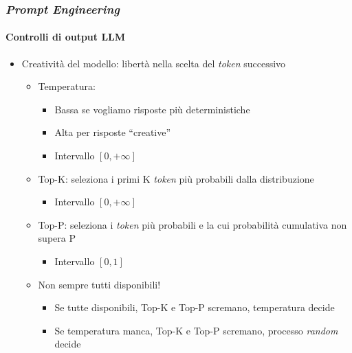 \begin{frame}[t] \frametitle{\emph{Prompt Engineering}}
\framesubtitle{Controlli di output LLM}
{\footnotesize
    \begin{minipage}[t]{\textwidth}
        \begin{itemize}[leftmargin=10pt,align=right]
            \item[\alertedcircled{2}] \alert{Creatività del modello:} libertà nella scelta del \emph{token} successivo
            \begin{itemize}[leftmargin=10pt,align=right]
                \item[\alert{\faArrowCircleRight}] \alert{Temperatura:}
                \begin{itemize}[leftmargin=10pt,align=right]
                    \item[\alert{\faArrowCircleRight}] \alert{Bassa} se vogliamo risposte più deterministiche
                    \item[\alert{\faArrowCircleRight}] \alert{Alta} per risposte ``creative''
                    \item[\alert{\faExclamationTriangle}] Intervallo $[0, +\infty]$
                \end{itemize}
                \item[\alert{\faArrowCircleRight}] \alert{Top-K:} seleziona i primi K \textit{token} più probabili dalla distribuzione
                 \begin{itemize}[leftmargin=10pt,align=right]
                    \item[\alert{\faExclamationTriangle}] Intervallo $[0, +\infty]$
                \end{itemize}               
                \item[\alert{\faArrowCircleRight}] \alert{Top-P:} seleziona i \textit{token} più probabili e la cui probabilità cumulativa non supera P
                  \begin{itemize}[leftmargin=10pt,align=right]
                    \item[\alert{\faExclamationTriangle}] Intervallo $[0, 1]$
                \end{itemize}                    
                \item[\alert{\faExclamationTriangle}] Non sempre tutti disponibili!
                \begin{itemize}[leftmargin=10pt,align=right]
                    \item[\alert{\faArrowCircleRight}] Se tutte disponibili, Top-K e Top-P scremano, temperatura decide
                    \item[\alert{\faArrowCircleRight}] Se temperatura manca, Top-K e Top-P scremano, processo \textit{random} decide
                \end{itemize}
            \end{itemize}
        \end{itemize}
    \end{minipage}
}
\end{frame}
